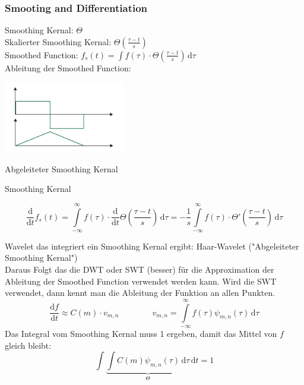 \subsubsection{Smooting and Differentiation}
\begin{minipage}[r]{0.5\textwidth}
Smoothing Kernal: $\Theta$\\
Skalierter Smoothing Kernal: $\Theta(\frac{\tau - t}{s})$\\
Smoothed Function: $f_s(t) = \int f(\tau) \cdot \Theta(\frac{\tau - t}{s}) \, \mathrm{d}\tau$\\
Ableitung der Smoothed Function: 
\end{minipage}
\begin{minipage}[r]{0.5\textwidth}
	\includegraphics[width=0.4\textwidth]{content/SmoothingFunction.pdf}
	
	\vspace{-2.2cm}
	
	\flushright
	Abgeleiteter Smoothing Kernal
	
	\vspace{.4cm}
	
	Smoothing Kernal	
\end{minipage}

\[ \frac{\mathrm{d}}{\mathrm{d}t}f_s(t) = \int\limits_{-\infty}^{\infty} f(\tau) \cdot \frac{\mathrm{d}}{\mathrm{d}t}\Theta(\frac{\tau - t}{s}) \, \mathrm{d}\tau = -\frac{1}{s} \int\limits_{-\infty}^{\infty} f(\tau) \cdot \Theta'(\frac{\tau - t}{s}) \, \mathrm{d}\tau \]

Wavelet das integriert ein Smoothing Kernal ergibt: Haar-Wavelet ("Abgeleiteter Smoothing Kernal")\\
Daraus Folgt das die DWT oder SWT (besser) für die Approximation der Ableitung der Smoothed Function verwendet werden kann. Wird die SWT verwendet, dann kennt man die Ableitung der Funktion an allen Punkten.
\[ 
	\frac{\mathrm{d}f}{\mathrm{d}t} \approx C(m) \cdot v_{m,n}
	\qquad \qquad
	v_{m,n} =  \int\limits_{-\infty}^{\infty} f(\tau) \psi_{m,n}(\tau) \, \mathrm{d}\tau 
\]
Das Integral vom Smoothing Kernal muss 1 ergeben, damit das Mittel von $f$ gleich bleibt: 
\[ \int \underbrace{\int C(m) \psi_{m,n}(\tau) \,\mathrm{d}\tau}_{\Theta} \,\mathrm{d}t = 1 \]



